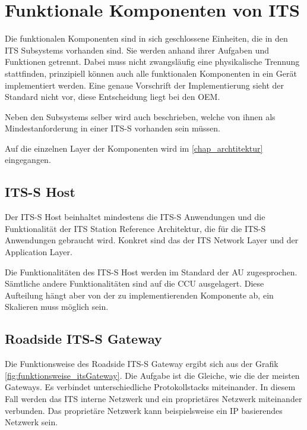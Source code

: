 \section{Funktionale Komponenten von ITS \label{funktionsweise_funktionaleKomponenten}}
Die funktionalen Komponenten sind in sich geschlossene Einheiten, die in den \ac{ITS} Subsystems vorhanden sind. Sie werden anhand ihrer Aufgaben und Funktionen getrennt. Dabei muss nicht zwangsläufig eine physikalische Trennung stattfinden, prinzipiell können auch alle funktionalen Komponenten in ein Gerät implementiert werden. Eine genaue Vorschrift der Implementierung sieht der Standard nicht vor, diese Entscheidung liegt bei den \ac{OEM}. 

Neben den Subsystems selber wird auch beschrieben, welche von ihnen als Mindestanforderung in einer \ac{ITS-S} vorhanden sein müssen.

Auf die einzelnen Layer der Komponenten wird im \autoref{chap_archtitektur} eingegangen.   

\subsection{ITS-S Host \label{funktionsweise_ITSHost}}
Der \ac{ITS-S} Host beinhaltet mindestens die \ac{ITS-S} Anwendungen und die Funktionalität der ITS  Station Reference Architektur, die für die  \ac{ITS-S} Anwendungen gebraucht wird. Konkret sind das der \ac{ITS} Network Layer und der Application Layer. 

Die Funktionalitäten des \ac{ITS-S} Host werden im Standard \cite{etsi302636-3} der \ac{AU} zugesprochen. Sämtliche andere Funktionalitäten sind auf die \ac{CCU} ausgelagert. Diese Aufteilung hängt aber von der zu implementierenden Komponente ab, ein Skalieren muss möglich sein.

\subsection{Roadside ITS-S Gateway \label{funktionsweise_RoadsideITSGateway}}
Die Funktionsweise des Roadside \ac{ITS-S} Gateway ergibt sich aus der Grafik \ref{fig:funktionsweise_itsGateway}. Die Aufgabe ist die Gleiche, wie die der meisten Gateways. Es verbindet unterschiedliche Protokollstacks miteinander. In diesem Fall werden das \ac{ITS} interne Netzwerk und ein proprietäres Netzwerk miteinander verbunden. Das proprietäre Netzwerk kann beispielsweise ein IP basierendes Netzwerk sein.

